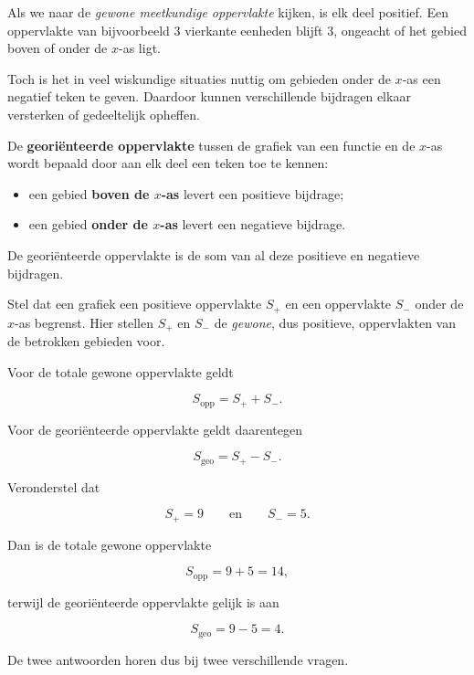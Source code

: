 \documentclass{ximera}
\begin{document}
Als we naar de \emph{gewone meetkundige oppervlakte} kijken, is elk
deel positief. Een oppervlakte van bijvoorbeeld \(3\) vierkante
eenheden blijft \(3\), ongeacht of het gebied boven of onder de
\(x\)-as ligt.

Toch is het in veel wiskundige situaties nuttig om gebieden onder de
\(x\)-as een negatief teken te geven. Daardoor kunnen verschillende
bijdragen elkaar versterken of gedeeltelijk opheffen.

\begin{definitie}
De \textbf{georiënteerde oppervlakte} tussen de grafiek van een functie
en de \(x\)-as wordt bepaald door aan elk deel een teken toe te kennen:

\begin{itemize}
    \item een gebied \textbf{boven de \(x\)-as} levert een positieve bijdrage;
    \item een gebied \textbf{onder de \(x\)-as} levert een negatieve bijdrage.
\end{itemize}

De georiënteerde oppervlakte is de som van al deze positieve en
negatieve bijdragen.
\end{definitie}




Stel dat een grafiek een positieve oppervlakte \(S_+\) en een
oppervlakte \(S_-\) onder de \(x\)-as begrenst. Hier stellen
\(S_+\) en \(S_-\) de \emph{gewone}, dus positieve, oppervlakten van de
betrokken gebieden voor.

Voor de totale gewone oppervlakte geldt

\[
S_{\mathrm{opp}}=S_+ + S_-.
\]

Voor de georiënteerde oppervlakte geldt daarentegen

\[
S_{\mathrm{geo}}=S_+ - S_-.
\]

\begin{voorbeeld}

Veronderstel dat

\[
S_+=9
\qquad\text{en}\qquad
S_-=5.
\]

Dan is de totale gewone oppervlakte

\[
S_{\mathrm{opp}}=9+5=14,
\]

terwijl de georiënteerde oppervlakte gelijk is aan

\[
S_{\mathrm{geo}}=9-5=4.
\]

De twee antwoorden horen dus bij twee verschillende vragen.
\end{voorbeeld}
\end{document}
